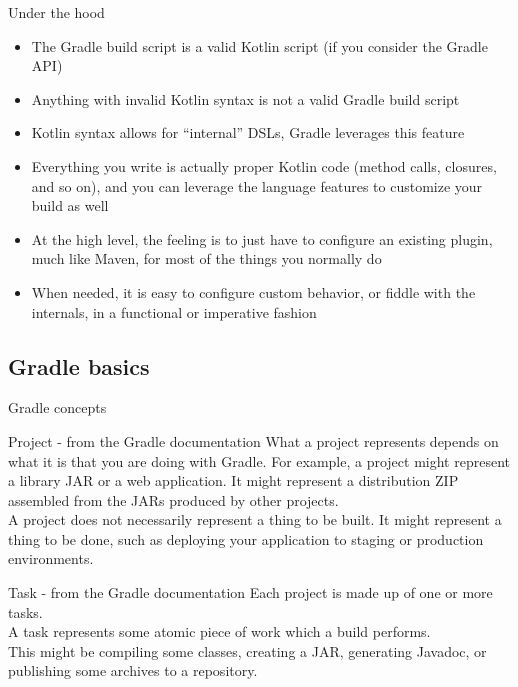 \documentclass[presentation]{beamer}
\begin{document}
\begin{frame}[fragile]{Under the hood}
	\begin{itemize}
		\item The Gradle build script is a valid Kotlin script (if you consider the Gradle API)
		\item Anything with invalid Kotlin syntax is not a valid Gradle build script
		\item Kotlin syntax allows for ``internal'' DSLs, Gradle leverages this feature
		\item Everything you write is actually proper Kotlin code (method calls, closures, and so on), and you can leverage the language features to customize your build as well
		\item At the high level, the feeling is to just have to configure an existing plugin, much like Maven, for most of the things you normally do
		\item When needed, it is easy to configure custom behavior, or fiddle with the internals, in a functional or imperative fashion
	\end{itemize}
\end{frame}

\subsection{Gradle basics}

\begin{frame}[fragile]{Gradle concepts}
	\begin{block}{Project - from the Gradle documentation}
			What a project represents depends on what it is that you are doing with Gradle. For example, a project might represent a library JAR or a web application. It might represent a distribution ZIP assembled from the JARs produced by other projects. \\
			A project does not necessarily represent a thing to be built.
			It might represent a thing to be done, such as deploying your application to staging or production environments.
	\end{block}
	\begin{block}{Task - from the Gradle documentation}
			Each project is made up of one or more tasks. \\
			A task represents some atomic piece of work which a build performs.\\
			This might be compiling some classes, creating a JAR, generating Javadoc, or publishing some archives to a repository.
	\end{block}
\end{frame}
\end{document}
